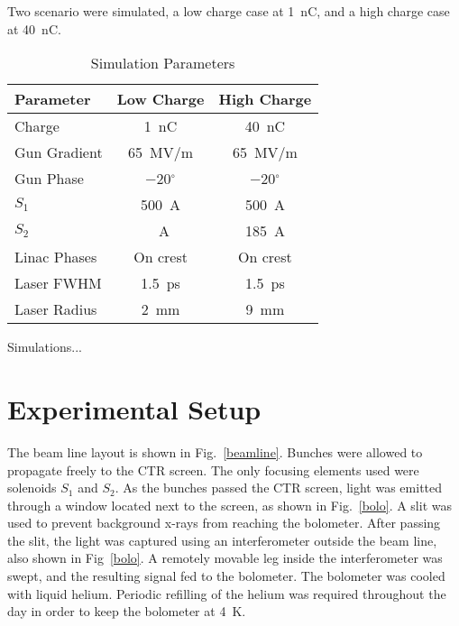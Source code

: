 \documentclass[letterpaper,  %
              ]{jacow-2_3}   %
\begin{document}
Two scenario were simulated, a low charge case at \SI{1}{nC}, and a 
high charge case at \SI{40}{nC}. 

\begin{table}[hbt]
	\centering
	\caption{Simulation Parameters}
	\begin{tabular}{lcc}
		\toprule
		\textbf{Parameter} & \textbf{Low Charge}  & \textbf{High Charge} \\
		\midrule
		Charge       & \SI{1}{nC}        & \SI{40}{nC}    \\ %
		Gun Gradient & \SI{65}{MV/m}     & \SI{65}{MV/m}  \\ %
		Gun Phase    & \SI{-20}{}$^{\circ}$ & \SI{-20}{}$^{\circ}$ \\		 
		$S_1$        & \SI{500}{A}		 & \SI{500}{A}	  \\
		$S_2$		 & \SI{}{A}   	 & \SI{185}{A}		 \\
		Linac Phases & On crest          & On crest       \\
		Laser FWHM   & \SI{1.5}{ps}      & \SI{1.5}{ps}   \\ %
		Laser Radius & \SI{2}{mm}        & \SI{9}{mm}     \\
		\bottomrule
	\end{tabular}
	\label{simparam}
\end{table}

Simulations...


\section{Experimental Setup}
The beam line layout is shown in Fig.~\ref{beamline}. 
Bunches were allowed to propagate freely to the 
CTR screen. The only focusing elements used were solenoids $S_1$ and
$S_2$. As the bunches passed the CTR screen, light was
emitted through a window located next to the screen, 
as shown in Fig.~\ref{bolo}. A slit was used to prevent
background x-rays from reaching the bolometer.
After passing the slit, the light was captured 
using an interferometer outside the beam line, 
also shown in Fig~\ref{bolo}. 
A remotely movable leg inside the interferometer was swept, 
and the resulting signal fed to the bolometer. 
The bolometer was cooled with liquid helium. 
Periodic refilling of the helium was required throughout the day in order
to keep the bolometer at \SI{4}{K}.
 
\end{document}

